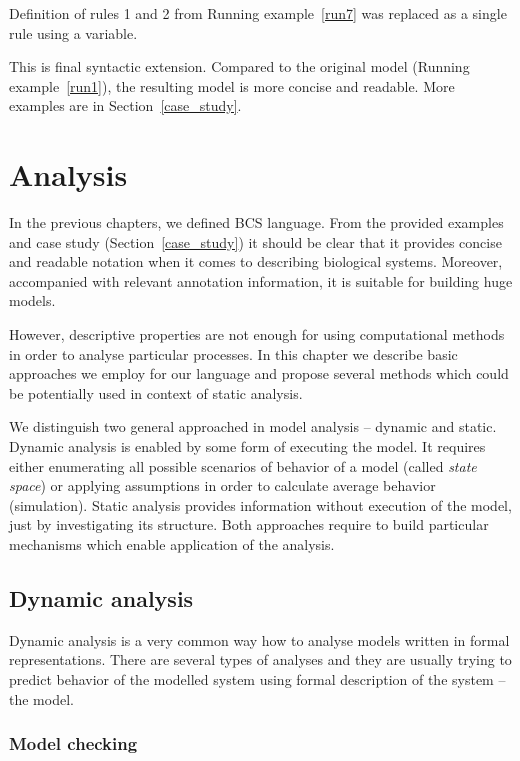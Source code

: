 \documentclass[12pt]{fithesis2}
\begin{document}
\noindent Definition of rules 1 and 2 from Running example~\ref{run7} was replaced as a single rule using a variable.

This is final syntactic extension. Compared to the original model (Running example~\ref{run1}), the resulting model is more concise and readable. More examples are in Section~\ref{case_study}.

\chapter{Analysis}
\label{analysis}

In the previous chapters, we defined BCS language. From the provided examples and case study (Section~\ref{case_study}) it should be clear that it provides concise and readable notation when it comes to describing biological systems. Moreover, accompanied with relevant annotation information, it is suitable for building huge models.

However, descriptive properties are not enough for using computational methods in order to analyse particular processes. In this chapter we describe basic approaches we employ for our language and propose several methods which could be potentially used in context of static analysis.

We distinguish two general approached in model analysis -- dynamic and static. Dynamic analysis is enabled by some form of executing the model. It requires either enumerating all possible scenarios of behavior of a model (called \emph{state space}) or applying assumptions in order to calculate average behavior (simulation). Static analysis provides information without execution of the model, just by investigating its structure. Both approaches require to build particular mechanisms which enable application of the analysis.

\section{Dynamic analysis}

Dynamic analysis is a very common way how to analyse models written in formal representations. There are several types of analyses and they are usually trying to predict behavior of the modelled system using formal description of the system -- the model.

\subsection{Model checking}
\end{document}
